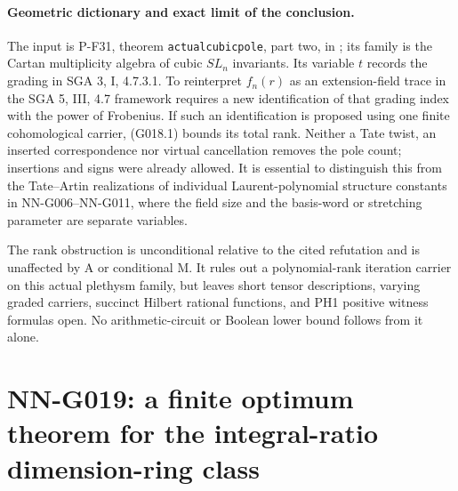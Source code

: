 \paragraph{Geometric dictionary and exact limit of the conclusion.}
The input is P-F31, theorem \texttt{actualcubicpole}, part two,
in ; its family is
the Cartan multiplicity algebra of cubic $SL_n$ invariants.
Its variable $t$ records the grading in SGA 3, I, 4.7.3.1.
To reinterpret $f_n(r)$ as an extension-field trace in the
SGA 5, III, 4.7 framework requires a new identification of
that grading index with the power of Frobenius. If such an
identification is proposed using one finite cohomological
carrier, (G018.1) bounds its total rank. Neither a Tate twist,
an inserted correspondence nor virtual cancellation removes
the pole count; insertions and signs were already allowed.
It is essential to distinguish this from the Tate--Artin
realizations of individual Laurent-polynomial structure
constants in NN-G006--NN-G011, where the field size and
the basis-word or stretching parameter are separate variables.

The rank obstruction is unconditional relative to the cited
refutation and is unaffected by A or conditional M. It
rules out a polynomial-rank iteration carrier on this actual
plethysm family, but leaves short tensor descriptions,
varying graded carriers, succinct Hilbert rational functions,
and PH1 positive witness formulas open. No arithmetic-circuit
or Boolean lower bound follows from it alone.



\section{NN-G019: a finite optimum theorem for the integral-ratio dimension-ring class}
